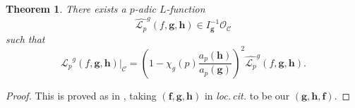 \documentclass[a4paper,11pt]{amsart}
\theoremstyle{plain}
\newtheorem{theorem}{Theorem}[section]
\theoremstyle{definition}
\theoremstyle{remark}
\newtheorem{remarkwr}[theorem]{Remark}
\newenvironment{remark}{\begin{remarkwr}\begin{upshape}}{\end{upshape}\end{remarkwr}}
\newcommand{\cl}{\mathcal}
\newcommand{\Lp}{{\mathscr{L}_p}}
\newcommand{\hf}{{\mathbf{f}}}
\newcommand{\hg}{{\mathbf{g}}}
\newcommand{\hh}{{\mathbf h}}
\numberwithin{equation}{section}
\begin{document}





\begin{theorem}\label{thm:improvedtripleproductpadicLfunction}
    There exists a $p$-adic $L$-function
    \[
    \widehat{\Lp}^g(f,\hg,\hh)\in I_{\hg}^{-1}\cl{O}_{\cl{C}}
    \]
    such that
    \[
    \Lp^g(f,\hg,\hh)\vert_{\cl{C}}=\left(1-\chi_g(p)\frac{a_p(\hh)}{a_p(\hg)}\right)^2 \widehat{\Lp}^g(f,\hg,\hh).
    \]
\end{theorem}
\begin{proof}
    This is proved as in \cite[Lemma~9.8]{BSV}, taking $(\hf,\hg,\hh)$ in \emph{loc.\,cit.} to be our $(\hg,\hh,\hf)$.%
\end{proof}
\end{document}
